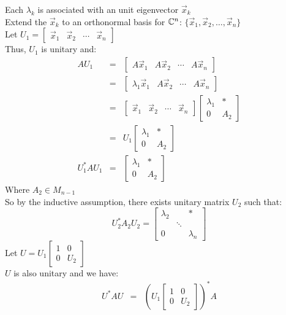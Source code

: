 \documentclass[letterpaper,12pt,fleqn]{article}
\renewcommand{\l}{\lambda}
\newcommand{\vx}{\vec{x}}
\begin{document}
\begin{theproof}
\begin{description}
    Each $\l_k$ is associated with an unit eigenvector $\vx_k$ \\
    Extend the $\vx_k$ to an orthonormal basis for $\mathbb{C}^n$:
    $\{\vx_1,\vx_2,\ldots,\vx_n\}$ \\
    Let $U_1=\begin{bmatrix} \vx_1 & \vx_2 & \cdots & \vx_n \end{bmatrix}$ \\
    Thus, $U_1$ is unitary and:
    \begin{eqnarray*}
      AU_1 &=&
      \begin{bmatrix} A\vx_1 & A\vx_2 & \cdots & A\vx_n \end{bmatrix} \\
      &=& \begin{bmatrix} \l_1\vx_1 & A\vx_2 & \cdots & A\vx_n \end{bmatrix} \\
      &=& \begin{bmatrix} \vx_1 & \vx_2 & \cdots & \vx_n \end{bmatrix}
      \begin{bmatrix} \l_1 & * \\ 0 & A_2 \end{bmatrix} \\
      &=& U_1\begin{bmatrix} \l_1 & * \\ 0 & A_2 \end{bmatrix} \\
      U_1^*AU_1 &=& \begin{bmatrix} \l_1 & * \\ 0 & A_2 \end{bmatrix}
    \end{eqnarray*}
    Where $A_2\in M_{n-1}$ \\
    So by the inductive assumption, there exists unitary matrix $U_2$ such
    that:
    \[U_2^*A_2U_2=
    \begin{bmatrix} \l_2 & & * \\ & \ddots & \\ 0 & & \l_n \end{bmatrix}\]
    Let $U=U_1\begin{bmatrix} 1 & 0 \\ 0 & U_2 \end{bmatrix}$ \\
    $U$ is also unitary and we have:
    \begin{eqnarray*}
      U^*AU &=&
      \left(U_1\begin{bmatrix} 1 & 0 \\ 0 & U_2 \end{bmatrix}\right)^*A

\end{eqnarray*}
\end{description}
\end{theproof}
\end{document}

